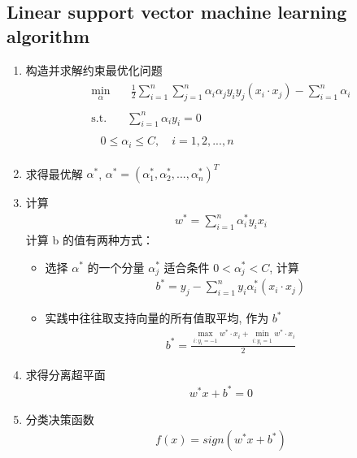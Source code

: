 \documentclass[oneside, 12pt]{ctexbook}
\begin{document}
			\subsection{\quad Linear support vector machine learning algorithm}
				\begin{enumerate}
					\item 构造并求解约束最优化问题
						\begin{align}
							\begin{split}
								\min\limits_{\alpha} \quad & \frac{1}{2}\sum_{i=1}^{n}\sum_{j=1}^{n} \alpha_i\alpha_j y_i y_j (x_i \cdot x_j) - \sum_{i=1}^{n}\alpha_i
							\end{split} \label{target_function_linear_svm} \\
							\begin{split}
								\text{s.t.} \quad &\sum_{i=1}^{n} \alpha_i y_i = 0
							\end{split} \label{equal_restrict_linear_svm} \\
							\begin{split}
								&0 \leq \alpha_i \leq C, \quad i=1,2,...,n
							\end{split} \label{alpha_restrict_linear_svm}
						\end{align}
						
					\item 求得最优解 $\alpha^*$, $\alpha^* = (\alpha_1^*,\alpha_2^*,...,\alpha_n^*)^T$
					
					\item 计算
						\begin{align}
							w^* = \sum_{i=1}^{n} \alpha_i^* y_i x_i
						\end{align}
						计算 b 的值有两种方式：
						\begin{itemize}
							\item 选择 $\alpha^*$ 的一个分量 $\alpha_j^*$ 适合条件 $0 < \alpha_j^* < C$, 计算
								\begin{align}
									b^* = y_j - \sum_{i=1}^{n}y_i \alpha_i^*(x_i \cdot x_j)
								\end{align}
							
							\item 实践中往往取支持向量的所有值取平均, 作为 $b^*$
								\begin{align}
									b^* = \frac{\max\limits_{i: y_i=-1} w^* \cdot x_i + \min\limits_{i: y_i=1} w^* \cdot x_i}{2}
								\end{align}
						\end{itemize}
						
					\item 求得分离超平面
						\begin{align}
							w^* x + b^* = 0
						\end{align}
						
					\item 分类决策函数
						\begin{align}
							f(x) = sign(w^* x + b^*)
						\end{align}
				\end{enumerate}
			
\end{document}
